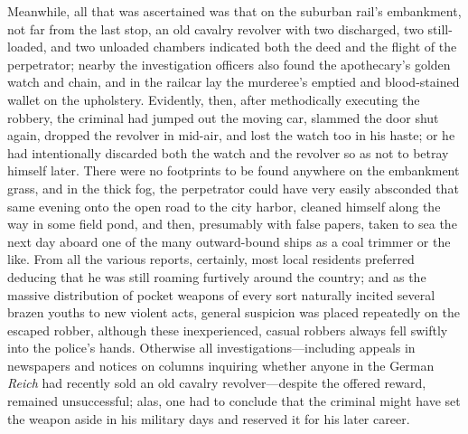 \documentclass[12pt,a4paper]{article}
\begin{document}
Meanwhile, all that was ascertained was that on the suburban rail’s embankment, not far from the last stop, an old cavalry revolver with two discharged, two still-loaded, and two unloaded chambers indicated both the deed and the flight of the perpetrator; nearby the investigation officers also found the apothecary’s golden watch and chain, and in the railcar lay the murderee’s emptied and blood-stained wallet on the upholstery. Evidently, then, after methodically executing the robbery, the criminal had jumped out the moving car, slammed the door shut again, dropped the revolver in mid-air, and lost the watch too in his haste; or he had intentionally discarded both the watch and the revolver so as not to betray himself later. There were no footprints to be found anywhere on the embankment grass, and in the thick fog, the perpetrator could have very easily absconded that same evening onto the open road to the city harbor, cleaned himself along the way in some field pond, and then, presumably with false papers, taken to sea the next day aboard one of the many outward-bound ships as a coal trimmer or the like. From all the various reports, certainly, most local residents preferred deducing that he was still roaming furtively around the country; and as the massive distribution of pocket weapons of every sort naturally incited several brazen youths to new violent acts, general suspicion was placed repeatedly on the escaped robber, although these inexperienced, casual robbers always fell swiftly into the police’s hands. Otherwise all investigations—including appeals in newspapers and notices on columns inquiring whether anyone in the German \textit{Reich} had recently sold an old cavalry revolver—despite the offered reward, remained unsuccessful; alas, one had to conclude that the criminal might have set the weapon aside in his military days and reserved it for his later career.
\end{document}
